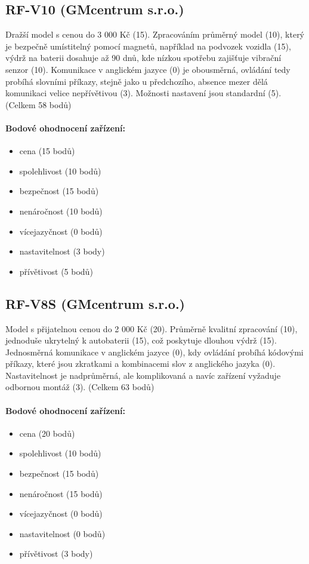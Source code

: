 \documentclass[FM,MP]{tulthesis}  %
\begin{document}
\subsection{RF-V10 (GMcentrum s.r.o.)}
Dražší model s cenou do 3 000 Kč (15). Zpracováním průměrný model (10), který je bezpečně umístitelný pomocí magnetů, například na podvozek vozidla (15), výdrž na baterii dosahuje až 90 dnů, kde nízkou spotřebu zajišťuje vibrační senzor (10). Komunikace v anglickém jazyce (0) je obousměrná, ovládání tedy probíhá slovními příkazy, stejně jako u předchozího, absence mezer dělá komunikaci velice nepřívětivou (3). Možnosti nastavení jsou standardní (5). (Celkem 58 bodů)

\paragraph{Bodové ohodnocení zařízení:}
\begin{itemize}
\item cena (15 bodů)
\item spolehlivost (10 bodů)
\item bezpečnost (15 bodů)
\item nenáročnost (10 bodů)
\item vícejazyčnost (0 bodů)
\item nastavitelnost (3 body)
\item přívětivost (5 bodů)
\end{itemize}

\subsection{RF-V8S (GMcentrum s.r.o.)}
Model s přijatelnou cenou do 2 000 Kč (20). Průměrně kvalitní zpracování (10), jednoduše ukrytelný k autobaterii (15), což poskytuje dlouhou výdrž (15). Jednosměrná komunikace v anglickém jazyce (0), kdy ovládání probíhá kódovými příkazy, které jsou zkratkami a kombinacemi slov z anglického jazyka (0). Nastavitelnost je nadprůměrná, ale komplikovaná a navíc zařízení vyžaduje odbornou montáž (3). (Celkem 63 bodů)

\paragraph{Bodové ohodnocení zařízení:}
\begin{itemize}
\item cena (20 bodů)
\item spolehlivost (10 bodů)
\item bezpečnost (15 bodů)
\item nenáročnost (15 bodů)
\item vícejazyčnost (0 bodů)
\item nastavitelnost (0 bodů)
\item přívětivost (3 body)
\end{itemize}
\end{document}
